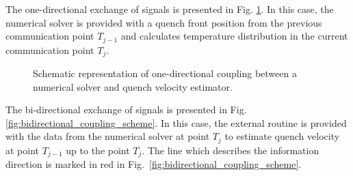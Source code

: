 The one-directional exchange of signals is presented in Fig. \ref{fig:unidirectional_coupling_scheme}. In this case, the numerical solver is provided with a quench front position from the previous communication point $T_{j-1}$ and calculates temperature distribution in the current communication point $T_j$.

\begin{figure}[H]
\centering
{}
\caption{Schematic representation of one-directional coupling between a numerical solver and quench velocity estimator.}
\label{fig:unidirectional_coupling_scheme}
\end{figure}

The bi-directional exchange of signals is presented in Fig. \ref{fig:bidirectional_coupling_scheme}. In this case, the external routine is provided with the data from the numerical solver at point $T_j$ to estimate quench velocity at point $T_{j-1}$ up to the point $T_j$. The line which describes the information direction is marked in red in Fig.~\ref{fig:bidirectional_coupling_scheme}. 

